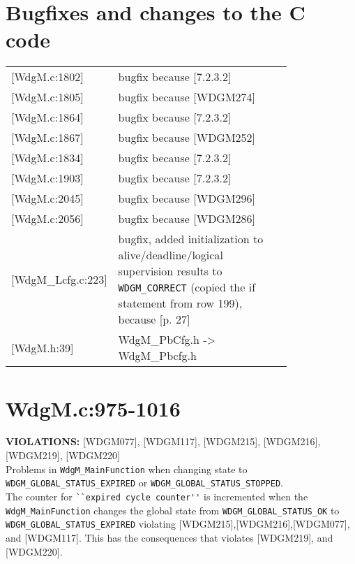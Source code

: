 \documentclass[11pt,a4paper]{article}
\begin{document}
\section{Bugfixes and changes to the C code}
\begin{longtable}{l p{0.8\linewidth}}

[WdgM.c:1802] & bugfix because [7.2.3.2]\\

[WdgM.c:1805] & bugfix because [WDGM274]\\

[WdgM.c:1864] & bugfix because [7.2.3.2]\\

[WdgM.c:1867] & bugfix because [WDGM252]\\

[WdgM.c:1834] & bugfix because [7.2.3.2]\\

[WdgM.c:1903] & bugfix because [7.2.3.2]\\

[WdgM.c:2045] & bugfix because [WDGM296]\\

[WdgM.c:2056] & bugfix because [WDGM286]\\

[WdgM\_Lcfg.c:223] & bugfix, added initialization to alive/deadline/logical supervision results to \verb!WDGM_CORRECT! (copied the if statement from row 199), because [p. 27]\\

[WdgM.h:39] & WdgM\_PbCfg.h -> WdgM\_Pbcfg.h\\
\end{longtable}

\newpage
{}

\lstset{language=autosar}

\section{WdgM.c:975-1016}
\textbf{VIOLATIONS:} [WDGM077], [WDGM117], [WDGM215], [WDGM216], [WDGM219],
[WDGM220]\\[0.5cm]

Problems in \lstinline!WdgM_MainFunction! when changing state to
\lstinline!WDGM_GLOBAL_STATUS_EXPIRED! or
\lstinline!WDGM_GLOBAL_STATUS_STOPPED!.\\[0.5cm]
The counter for \lstinline!``expired cycle counter''! is incremented when the
\lstinline!WdgM_MainFunction! changes the global state from
\lstinline!WDGM_GLOBAL_STATUS_OK! to \lstinline!WDGM_GLOBAL_STATUS_EXPIRED!
violating [WDGM215],[WDGM216],[WDGM077], and [WDGM117].
This has the consequences that violates [WDGM219], and [WDGM220].\\
\end{document}
